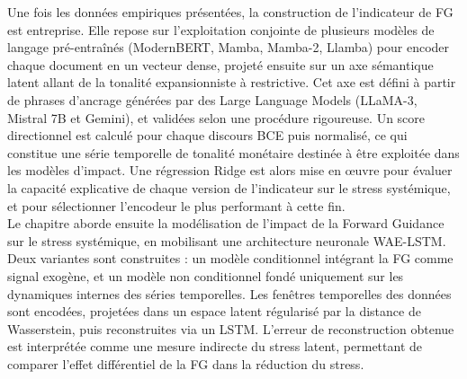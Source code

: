 Une fois les données empiriques présentées, la construction de l’indicateur de FG est entreprise. Elle repose sur l’exploitation conjointe de plusieurs modèles de langage pré-entraînés (ModernBERT, Mamba, Mamba-2, Llamba) pour encoder chaque document en un vecteur dense, projeté ensuite sur un axe sémantique latent allant de la tonalité expansionniste à restrictive. Cet axe est défini à partir de phrases d’ancrage générées par des Large Language Models (LLaMA-3, Mistral 7B et Gemini), et validées selon une procédure rigoureuse. Un score directionnel est calculé pour chaque discours BCE puis normalisé, ce qui constitue une série temporelle de tonalité monétaire destinée à être exploitée dans les modèles d’impact. Une régression Ridge est alors mise en œuvre pour évaluer la capacité explicative de chaque version de l’indicateur sur le stress systémique, et pour sélectionner l’encodeur le plus performant à cette fin.\\

Le chapitre aborde ensuite la modélisation de l’impact de la Forward Guidance sur le stress systémique, en mobilisant une architecture neuronale WAE-LSTM. Deux variantes sont construites : un modèle conditionnel intégrant la FG comme signal exogène, et un modèle non conditionnel fondé uniquement sur les dynamiques internes des séries temporelles. Les fenêtres temporelles des données sont encodées, projetées dans un espace latent régularisé par la distance de Wasserstein, puis reconstruites via un LSTM. L’erreur de reconstruction obtenue est interprétée comme une mesure indirecte du stress latent, permettant de comparer l’effet différentiel de la FG dans la réduction du stress.\\

